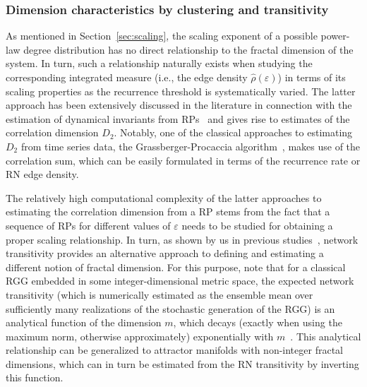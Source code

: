        		 \subsubsection{Dimension characteristics by clustering and transitivity} \label{sec:transitivity}
		As mentioned in Section~\ref{sec:scaling}, the scaling exponent of a possible power-law degree distribution has no direct relationship to the fractal dimension of the system. In turn, such a relationship naturally exists when studying the corresponding integrated measure (i.e., the edge density $\hat{\rho}(\varepsilon)$) in terms of its scaling properties as the recurrence threshold is systematically varied. The latter approach has been extensively discussed in the literature in connection with the estimation of dynamical invariants from RPs~\cite{Faure1998,thiel2004a} and gives rise to estimates of the correlation dimension $D_2$. Notably, one of the classical approaches to estimating $D_2$ from time series data, the Grassberger-Procaccia algorithm~\cite{Grassberger1983PLA,Grassberger1983PRL}, makes use of the correlation sum, which can be easily formulated in terms of the recurrence rate or RN edge density.

		The relatively high computational complexity of the latter approaches to estimating the correlation dimension from a RP stems from the fact that a sequence of RPs for different values of $\varepsilon$ needs to be studied for obtaining a proper scaling relationship. In turn, as shown by us in previous studies~\cite{Donner2011b}, network transitivity provides an alternative approach to defining and estimating a different notion of fractal dimension. For this purpose, note that for a classical RGG embedded in some integer-dimensional metric space, the expected network transitivity (which is numerically estimated as the ensemble mean over sufficiently many realizations of the stochastic generation of the RGG) is an analytical function of the dimension $m$, which decays (exactly when using the maximum norm, otherwise approximately) exponentially with $m$~\cite{Dall2002}. This analytical relationship can be generalized to attractor manifolds with non-integer fractal dimensions, which can in turn be estimated from the RN transitivity by inverting this function.


